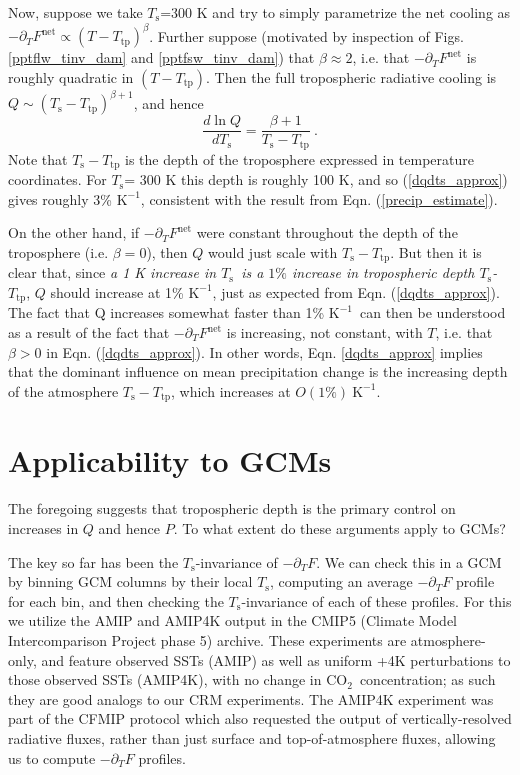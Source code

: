 \documentclass[9pt,twocolumn,twoside,lineno]{pnas-new}
\newcommand{\beqn}{\begin{equation}}
\newcommand{\eeqn}{\end{equation}}
\newcommand{\eqnref}[1]{(\ref{#1})}
\newcommand{\ppt}{\ensuremath{\partial_T}}
\newcommand{\cotwo}{\ensuremath{\mathrm{CO_2}}}
\newcommand{\Fnet}{\ensuremath{F^\mathrm{net}}}
\newcommand{\Kinverse}{\ensuremath{\mathrm{K^{-1}}}}
\newcommand{\Ts}{\ensuremath{T_\mathrm{s}}}
\newcommand{\Ttp}{\ensuremath{T_\mathrm{tp}}}
\begin{document}
Now, suppose we take \Ts=300 K and  try to simply parametrize the net cooling as $-\ppt \Fnet \propto (T-\Ttp)^\beta$.  Further suppose (motivated by inspection of Figs. \ref{pptflw_tinv_dam} and \ref{pptfsw_tinv_dam})  that $\beta \approx 2$, i.e. that $-\ppt \Fnet$ is roughly quadratic  in $(T-\Ttp)$. Then the full tropospheric radiative cooling is $Q\sim (\Ts-\Ttp)^{\beta+1}$, and hence 
	\beqn
		\frac{d \ln Q}{d \Ts}  =  \frac{\beta+1}{\Ts-\Ttp}\ . \label{dqdts_approx}
	\eeqn
Note that $\Ts-\Ttp$ is the depth of the troposphere expressed in temperature coordinates. For  \Ts= 300 K this depth is roughly 100 K, and so \eqnref{dqdts_approx} gives roughly 3\% \Kinverse, consistent with the result from Eqn. \eqnref{precip_estimate}.

On the other hand, if $-\ppt \Fnet$ were constant throughout the depth of the troposphere (i.e. $\beta=0$), then $Q$ would just scale with $\Ts-\Ttp$. But then it is clear that, since \emph{a 1 K increase in \Ts\  is a $1\%$ increase in tropospheric depth \Ts-\Ttp}, $Q$ should increase at 1\% \Kinverse, just as expected from Eqn. \eqnref{dqdts_approx}. The fact that Q increases somewhat faster than 1\% \Kinverse\  can then be understood as a result of the fact that $-\ppt \Fnet$ is increasing, not constant, with $T$, i.e. that $\beta>0$ in Eqn. \eqnref{dqdts_approx}. In other words, Eqn. \ref{dqdts_approx} implies that the dominant influence on mean precipitation change is the increasing depth of the atmosphere $\Ts-\Ttp$, which increases at $O(1\%)\ \Kinverse$.



\section{Applicability to GCMs} \label{sec_GCMs}
The foregoing suggests that tropospheric depth is the primary control on increases in $Q$ and hence $P$. To what extent do these arguments apply to GCMs?

The key so far has been  the \Ts-invariance of $-\ppt F$. We can check this in a GCM by binning  GCM columns by their local \Ts, computing an average $-\ppt F$ profile for each bin, and then checking the \Ts-invariance of each of these profiles. For this we utilize the AMIP and AMIP4K  output in the CMIP5 (Climate Model Intercomparison Project phase 5) archive. These experiments are atmosphere-only, and feature observed SSTs (AMIP) as well as uniform +4K perturbations to those observed SSTs (AMIP4K), with no change in \cotwo\ concentration; as such they are good analogs to our CRM experiments. The AMIP4K experiment was part of the CFMIP protocol \cite[Cloud Feedback Model Intercomparison Project,][]{bony2011} which also requested the output of vertically-resolved radiative fluxes, rather than just surface and top-of-atmosphere fluxes, allowing us to compute $-\ppt F$ profiles.
\end{document}
